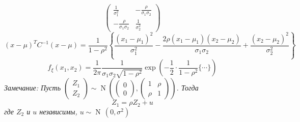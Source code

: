 {\begin{enumerate}
{\[\begin{pmatrix}
                    \frac{1}{\sigma_1^2} & -\frac{\rho}{\sigma_1\sigma_2}\\
                    -\frac{\rho}{\sigma_1\sigma_2} & \frac{1}{\sigma_2^2}
                \end{pmatrix}\]
                \[(x - \mu)^TC^{-1}(x - \mu) = \frac{1}{1 - \rho^2}\left\{\frac{(x_1 - \mu_1)^2}{\sigma_1^2} - \frac{2\rho(x_1 - \mu_1)(x_2 - \mu_2)}{\sigma_1\sigma_2} + \frac{(x_2 - \mu_2)^2}{\sigma_2^2}\right\}\]
                \[f_\xi(x_1,x_2) = \frac{1}{2\pi}\frac{1}{\sigma_1\sigma_2\sqrt{1 - \rho^2}}\exp\left(-\frac{1}{2}\cdot\frac{1}{1 - \rho^2}\{\cdots\}\right)\]
                \textit{Замечание: Пусть $\begin{pmatrix}
                    Z_1\\
                    Z_2
                \end{pmatrix} \sim \operatorname{N}\left(\begin{pmatrix}
                    0\\
                    0
                \end{pmatrix},\begin{pmatrix}
                    1 & \rho\\
                    \rho & 1
                \end{pmatrix}\right)$. Тогда
                \[Z_1 = \rho Z_2 + u\]
                где $Z_2$ и $u$ независимы, $u \sim \operatorname{N}\,(0, \sigma^2)$}
                \prof{
                    \[\begin{pmatrix}
                    u\\
                    Z_2
                \end{pmatrix} = \begin{pmatrix}
                    1 & -\rho\\
                    0 & 1
                \end{pmatrix}\begin{pmatrix}
                    Z_1\\
                    Z_2
                \end{pmatrix} = \begin{pmatrix}
                    Z_1 - \rho Z_2\\
                    z_2
                \end{pmatrix} \sim \operatorname{N}\left(\begin{pmatrix}
                    0\\
                    0
                \end{pmatrix}, \begin{pmatrix}

\end{pmatrix}\]}}
\end{enumerate}}
